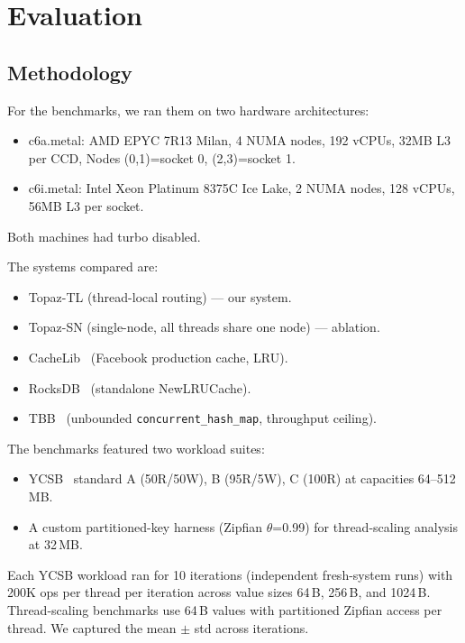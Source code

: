 \documentclass[sigplan,10pt]{acmart}
\begin{document}
\section{Evaluation}
\label{sec:eval}

\subsection{Methodology}

%
For the benchmarks, we ran them on two hardware architectures:
\begin{itemize}
  \item c6a.metal: AMD EPYC 7R13 Milan, 4 NUMA nodes, 192 vCPUs, 32MB L3 per CCD, Nodes (0,1)=socket 0, (2,3)=socket 1.
  \item c6i.metal: Intel Xeon Platinum 8375C Ice Lake, 2 NUMA nodes, 128 vCPUs, 56MB L3 per socket.
\end{itemize}
Both machines had turbo disabled.

The systems compared are:
\begin{itemize}
  \item Topaz-TL (thread-local routing) --- our system.
  \item Topaz-SN (single-node, all threads share one node) --- ablation.
  \item CacheLib~\cite{cachelib} (Facebook production cache, LRU).
  \item RocksDB~\cite{rocksdb} (standalone NewLRUCache).
  \item TBB~\cite{tbb} (unbounded \texttt{concurrent\_hash\_map}, throughput ceiling).
\end{itemize}

The benchmarks featured two workload suites:
\begin{itemize}
  \item YCSB~\cite{ycsb} standard A (50R/50W), B (95R/5W), C (100R) at capacities 64--512\,MB.
  \item A custom partitioned-key harness (Zipfian $\theta$=0.99) for thread-scaling analysis at 32\,MB.
\end{itemize}
Each YCSB workload ran for 10 iterations (independent fresh-system runs) with 200K ops per thread per iteration
across value sizes 64\,B, 256\,B, and 1024\,B.
Thread-scaling benchmarks use 64\,B values with partitioned Zipfian access per thread.
We captured the mean $\pm$ std across iterations.
\end{document}
